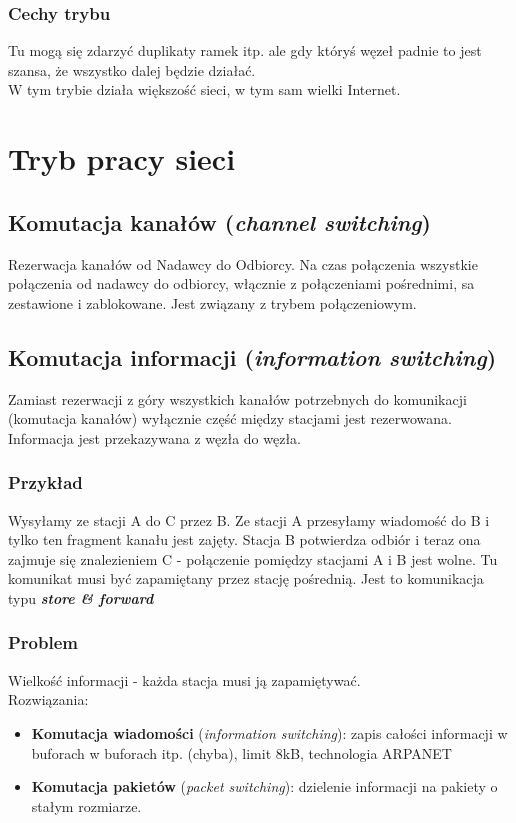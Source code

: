 \documentclass[a4paper,twoside]{article}
\begin{document}
			\subsubsection{Cechy trybu}
				Tu mogą się zdarzyć duplikaty ramek itp. ale gdy któryś węzeł padnie to jest szansa, że wszystko dalej będzie działać.\\
				W tym trybie działa większość sieci, w tym sam wielki Internet.
	\section{Tryb pracy sieci}
		\subsection{Komutacja kanałów (\emph{channel switching})}
			Rezerwacja kanałów od Nadawcy do Odbiorcy. Na czas połączenia wszystkie połączenia od nadawcy do odbiorcy, włącznie z połączeniami pośrednimi, sa zestawione i zablokowane. Jest związany z trybem połączeniowym.
		\subsection{Komutacja informacji (\emph{information switching})}
			Zamiast rezerwacji z góry wszystkich kanałów potrzebnych do komunikacji (komutacja kanałów) wyłącznie część między stacjami jest rezerwowana. Informacja jest przekazywana z węzła do węzła.
			\subsubsection{Przykład}
				Wysyłamy ze stacji A do C przez B. Ze stacji A przesyłamy wiadomość do B i tylko ten fragment kanału jest zajęty. Stacja B potwierdza odbiór i teraz ona zajmuje się znalezieniem C - połączenie pomiędzy stacjami A i B jest wolne. Tu komunikat musi być zapamiętany przez stację pośrednią. Jest to komunikacja typu \textbf{\emph{store \& forward}}
			\subsubsection{Problem}
				Wielkość informacji - każda stacja musi ją zapamiętywać.\\
				Rozwiązania:
				\begin{itemize}
					\item \textbf{Komutacja wiadomości} (\emph{information switching}): zapis całości informacji w buforach w buforach itp. (chyba), limit 8kB, technologia ARPANET
					\item \textbf{Komutacja pakietów} (\emph{packet switching}): dzielenie informacji na pakiety o stałym rozmiarze.
				\end{itemize}
\end{document}
